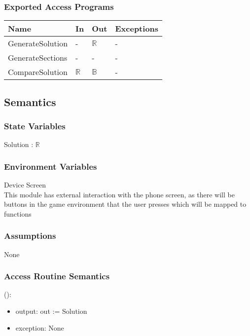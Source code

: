 \documentclass[12pt, titlepage]{article}
\begin{document}
\subsubsection{Exported Access Programs}

\begin{center}
\begin{tabular}{p{4cm} p{3cm} p{3cm} p{3cm}}
\hline
\textbf{Name} & \textbf{In} & \textbf{Out} & \textbf{Exceptions} \\
\hline
GenerateSolution & - & $\mathds{R}$ & - \\
GenerateSections & - & - & - \\
CompareSolution & $\mathds{R}$ & $\mathds{B}$ & - \\
\hline
\end{tabular}
\end{center}

\subsection{Semantics}

\subsubsection{State Variables}

Solution : $\mathds{R}$

\subsubsection{Environment Variables}

Device Screen\\
This module has external interaction with the phone screen, as there will be buttons in the game environment that the user presses which will be mapped to functions

\subsubsection{Assumptions}

None

\subsubsection{Access Routine Semantics}

():
\begin{itemize}
\item output: out := Solution
\item exception: None
\end{itemize}
\end{document}
